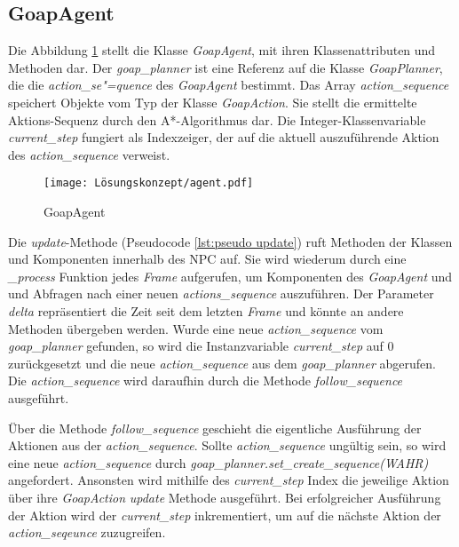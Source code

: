 \subsection{GoapAgent}
\label{chap:goapagent uml}

Die Abbildung \ref{fig:GoapAgent} stellt die Klasse \textit{GoapAgent}, mit ihren Klassenattributen und Methoden dar. Der \textit{goap\_planner} ist eine Referenz auf die Klasse \textit{GoapPlanner}, die die \textit{action\_se"=quence} des \textit{GoapAgent} bestimmt. Das Array \textit{action\_sequence} speichert Objekte vom Typ der Klasse \textit{GoapAction}. Sie stellt die ermittelte Aktions-Sequenz durch den A*-Algorithmus dar. Die Integer-Klassenvariable \textit{current\_step} fungiert als Indexzeiger, der auf die aktuell auszuführende Aktion des \textit{action\_sequence} verweist.


\begin{figure}[h]
  \centering
  \texttt{[image: Lösungskonzept/agent.pdf]}
	\captionsetup{justification=justified, format=plain}
  \caption{GoapAgent}
  \label{fig:GoapAgent}
\end{figure}

Die \textit{update}-Methode (Pseudocode \ref{lst:pseudo update}) ruft Methoden der Klassen und Komponenten innerhalb des NPC auf. Sie wird wiederum durch eine \textit{\_process} Funktion jedes \textit{Frame} aufgerufen, um Komponenten des \textit{GoapAgent} und und Abfragen nach einer neuen \textit{actions\_sequence} auszuführen. Der Parameter \textit{delta} repräsentiert die Zeit seit dem letzten \textit{Frame} und könnte an andere Methoden übergeben werden. Wurde eine neue \textit{action\_sequence} vom \textit{goap\_planner} gefunden, so wird die Instanzvariable \textit{current\_step} auf $0$ zurückgesetzt und die neue \textit{action\_sequence} aus dem \textit{goap\_planner} abgerufen. Die \textit{action\_sequence} wird daraufhin durch die Methode \textit{follow\_sequence} ausgeführt.

\"{U}ber die Methode \textit{follow\_sequence} geschieht die eigentliche Ausführung der Aktionen aus der \textit{action\_sequence}. Sollte \textit{action\_sequence} ungültig sein, so wird eine neue \textit{action\_sequence} durch \textit{goap\_planner.set\_create\_sequence(WAHR)} angefordert. Ansonsten wird mithilfe des \textit{current\_step} Index die jeweilige Aktion über ihre \textit{GoapAction} \textit{update} Methode ausgeführt. Bei erfolgreicher Ausführung der Aktion wird der \textit{current\_step} inkrementiert, um auf die nächste Aktion der \textit{action\_seqeunce} zuzugreifen.


